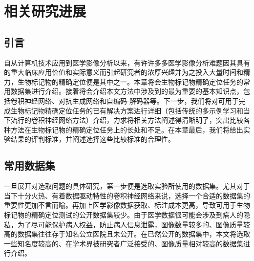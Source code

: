 \chapter{相关研究进展}
\section{引言}
自从计算机技术应用到医学影像分析以来，有许许多多医学影像分析难题因其具有的重大临床应用价值和实际意义而引起研究者的浓厚兴趣并为之投入大量时间和精力，生物标记物的精确定位便是其中之一。本章将会生物标记物精确定位任务的常用数据集进行介绍。接着将会介绍本文方法中涉及到的最为重要的基本知识点，包括卷积神经网络、对抗生成网络和自编码-解码器等。下一步，我们将对可用于完成生物标记物精确定位任务的已有解决方案进行详细（包括传统的多示例学习和当下流行的卷积神经网络方法）介绍，力求将相关方法阐述得清晰明了，突出比较各种方法在生物标记物的精确定位任务上的长处和不足。在本章最后，我们将给出实验结果的评判标准，并阐述选择这些比较标准的合理性。

\section{常用数据集}
一旦展开对选取问题的具体研究，第一步便是选取实验所使用的数据集。尤其对于当下十分火热、有着数据驱动特性的卷积神经网络来说，选择一个合适的数据集的重要性更加不言而喻。再加上医学影像数据获取、标注成本更高，导致可用于生物标记物的精确定位测试的公开数据集较少。由于医学数据很可能会涉及到病人的隐私，为了尽可能保护病人权益，防止病人信息泄露，图像数量较多的、图像质量较高的数据集往往存于知名公立医院且未公开。在已然公开的数据集中，本文将选取一些知名度较高的、在学术界被研究者广泛接受的、图像质量相对较高的数据集进行介绍。

